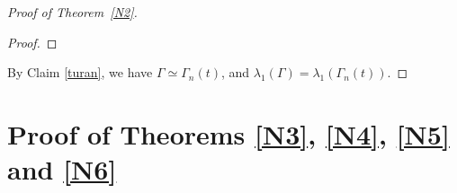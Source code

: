 \documentclass[12pt]{article}
\numberwithin{equation}{section}
\newtheorem {Theorem} {Theorem}[section]
\begin{document}
\begin{proof}[Proof of Theorem~\ref{N2}]
\begin{proof}
%
%
%
\end{proof}

By Claim \ref{turan}, we have $\Gamma\simeq \Gamma_n(t)$, and $\lambda_1(\Gamma)=\lambda_1(\Gamma_n(t))$. 
\end{proof}







\section{Proof of Theorems \ref{N3}, \ref{N4}, \ref{N5} and \ref{N6}} 


\end{document}
